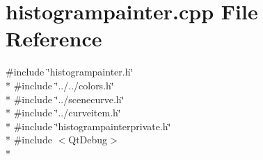 \section{histogrampainter.\+cpp File Reference}
\label{curve_2painters_2histogrampainter_8cpp}
{\ttfamily \#include \char`\"{}histogrampainter.\+h\char`\"{}}\\*
{\ttfamily \#include \char`\"{}../../colors.\+h\char`\"{}}\\*
{\ttfamily \#include \char`\"{}../scenecurve.\+h\char`\"{}}\\*
{\ttfamily \#include \char`\"{}../curveitem.\+h\char`\"{}}\\*
{\ttfamily \#include \char`\"{}histogrampainterprivate.\+h\char`\"{}}\\*
{\ttfamily \#include $<$Qt\+Debug$>$}\\*
